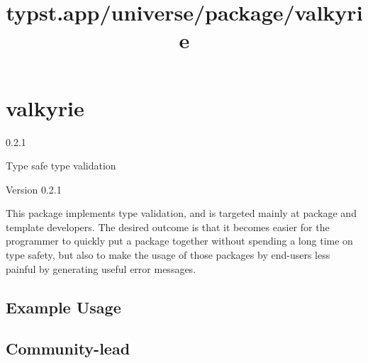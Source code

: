 \title{typst.app/universe/package/valkyrie}

\label{banner}
\section{valkyrie}\label{valkyrie}

{ 0.2.1 }

Type safe type validation

\label{readme}
Version 0.2.1

This package implements type validation, and is targeted mainly at
package and template developers. The desired outcome is that it becomes
easier for the programmer to quickly put a package together without
spending a long time on type safety, but also to make the usage of those
packages by end-users less painful by generating useful error messages.

\subsection{Example Usage}\label{example-usage}

\begin{Shaded}
\begin{Highlighting}[]

\NormalTok{      ),}
\NormalTok{    ),}
\NormalTok{  )}
\NormalTok{)}

\NormalTok{  (}
\NormalTok{    ),}
\NormalTok{  ),}
\NormalTok{)}
\end{Highlighting}
\end{Shaded}

\subsection{Community-lead}\label{community-lead}


